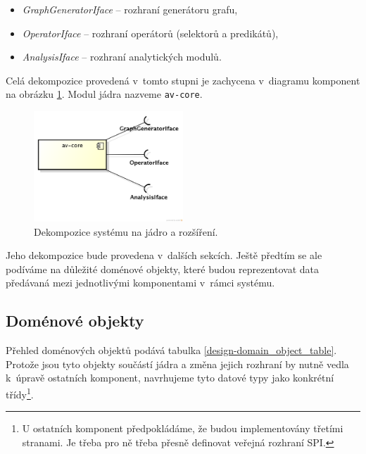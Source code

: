 \begin{itemize}
\item \emph{GraphGeneratorIface} -- rozhraní generátoru grafu,
\item \emph{OperatorIface} -- rozhraní operátorů (selektorů a predikátů),
\item \emph{AnalysisIface} -- rozhraní analytických modulů.
\end{itemize}

Celá dekompozice provedená v~tomto stupni je zachycena v~diagramu komponent na obrázku \ref{design-modules}. Modul jádra nazveme \verb+av-core+.
\begin{figure}[h!]
  \centering
  \includegraphics[width=0.5\textwidth]{./uml/archval_module_cmp.png}
  \caption{Dekompozice systému na jádro a rozšíření.\label{design-modules}}
\end{figure}
Jeho dekompozice bude provedena v~dalších sekcích. Ještě předtím se ale podíváme na důležité doménové objekty, které budou reprezentovat data předávaná mezi jednotlivými komponentami v~rámci systému.

\subsection{Doménové objekty}
\label{design-domain_objects}

Přehled doménových objektů podává tabulka \ref{design-domain_object_table}. Protože jsou tyto objekty součástí jádra a změna jejich rozhraní by nutně vedla k~úpravě ostatních komponent, navrhujeme tyto datové typy jako konkrétní třídy\footnote{U ostatních komponent předpokládáme, že budou implementovány třetími stranami. Je třeba pro ně třeba přesně definovat veřejná rozhraní SPI.}.

